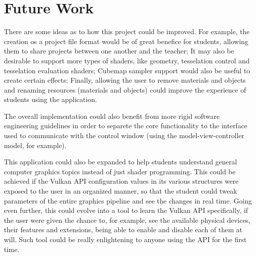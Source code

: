 \section{Future Work}
There are some ideas as to how this project could be improved. For example, the creation os a project file format would be of great benefice for students, allowing them to share projects between one another and the teacher; It may also be desirable to support more types of shaders, like geometry, tesselation control and tesselation evaluation shaders; Cubemap sampler support would also be useful to create certain effects; Finally, allowing the user to remove materials and objects and renaming resources (materials and objects) could improve the experience of students using the application.

The overall implementation could also benefit from more rigid software engineering guidelines in order to separete the core functionality to the interface used to communicate with the control window (using the model-view-controller model, for example).

This application could also be expanded to help students understand general computer graphics topics instead of just shader programming. This could be achieved if the Vulkan API configuration values in its various structures were exposed to the user in an organized manner, so that the student could tweak parameters of the entire graphics pipeline and see the changes in real time. Going even further, this could evolve into a tool to learn the Vulkan API specifically, if the user were given the chance to, for example, see the available physical devices, their features and extensions, being able to enable and disable each of them at will. Such tool could be really enlightening to anyone using the API for the first time.
